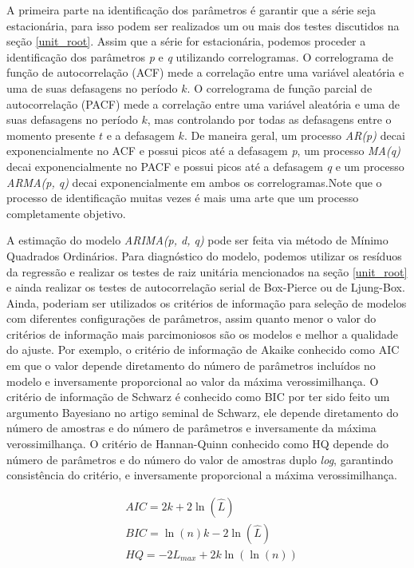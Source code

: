 \documentclass[twocolumn]{rbef}
\newcommand{\1}{\mathbbm{1}}
\begin{document}
A primeira parte na identificação dos parâmetros é garantir que a série seja estacionária, para isso podem ser realizados um ou mais dos testes discutidos na seção \ref{unit_root}. Assim que a série for estacionária, podemos proceder a identificação dos parâmetros \textit{p} e \textit{q} utilizando correlogramas. O correlograma de função de autocorrelação (ACF) mede a correlação entre uma variável aleatória e uma de suas defasagens no período $k$. O correlograma de função parcial de autocorrelação (PACF) mede a correlação entre uma variável aleatória e uma de suas defasagens no período $k$, mas controlando por todas as defasagens entre o momento presente $t$ e a defasagem $k$. De maneira geral, um processo \textit{AR(p)} decai exponencialmente no ACF e possui picos até a defasagem \textit{p}, um processo \textit{MA(q)} decai exponencialmente no PACF e possui picos até a defasagem \textit{q} e um processo \textit{ARMA(p, q)} decai exponencialmente em ambos os correlogramas.Note que o processo de identificação muitas vezes é mais uma arte que um processo completamente objetivo\cite{Enders}.

A estimação do modelo \textit{ARIMA(p, d, q)} pode ser feita via método de Mínimo Quadrados Ordinários. Para diagnóstico do modelo, podemos utilizar os resíduos da regressão e realizar os testes de raiz unitária mencionados na seção \ref{unit_root} e ainda realizar os testes de autocorrelação serial de Box-Pierce\cite{Box-Pierce} ou de Ljung-Box\cite{Ljung-Box}. Ainda, poderiam ser utilizados os critérios de informação para seleção de modelos com diferentes configurações de parâmetros, assim quanto menor o valor do critérios de informação mais parcimoniosos são os modelos e melhor a qualidade do ajuste. Por exemplo, o critério de informação de Akaike\cite{Akaike} conhecido como AIC em que o valor depende diretamento do número de parâmetros incluídos no modelo e inversamente proporcional ao valor da máxima verossimilhança. O critério de informação de Schwarz\cite{Schwarz} é conhecido como BIC por ter sido feito um argumento Bayesiano no artigo seminal de Schwarz, ele depende diretamento do número de amostras e do número de parâmetros e inversamente da máxima verossimilhança. O critério de Hannan-Quinn\cite{Hannan} conhecido como HQ depende do número de parâmetros e do número do valor de amostras duplo \textit{log}, garantindo consistência do critério, e inversamente proporcional a máxima verossimilhança.

\begin{equation}
    \begin{split}
        & AIC = 2k + 2 \ln (\hat{L}) \\
        & BIC = \ln (n) k - 2 \ln (\hat{L}) \\
        & HQ = -2 L_{max} + 2k \ln (\ln (n)) \\
    \end{split}
\end{equation}
\end{document}
